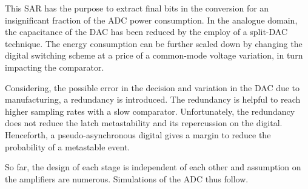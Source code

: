 This SAR has the purpose to extract final bits in the conversion for an insignificant fraction of the ADC power consumption. In the analogue domain, the capacitance of the DAC has been reduced by the employ of a split-DAC technique. The energy consumption can be further scaled down by changing the digital switching scheme at a price of a common-mode voltage variation, in turn impacting the comparator.

Considering, the possible error in the decision and variation in the DAC due to manufacturing, a redundancy is introduced. The redundancy is helpful to reach higher sampling rates with a slow comparator. Unfortunately, the redundancy does not reduce the latch metastability and its repercussion on the digital. Henceforth, a pseudo-asynchronous digital gives a margin to reduce the probability of a metastable event.

So far, the design of each stage is independent of each other and assumption on the amplifiers are numerous. Simulations of the ADC thus follow.






